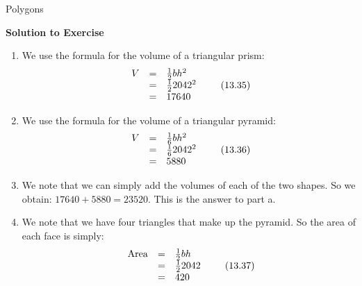 \begin{exercises}{Polygons}
{\begin{mdframed}[linewidth=4, leftmargin=40, rightmargin=40]
\begin{exercise}
\begin{figure}[H]
\begin{center}
    \end{center}

 \end{figure}   

    \addtocounter{footnote}{-0}
    \par 
\vspace{5pt}
\label{m39357*solid7634}\noindent\textbf{Solution to Exercise }
\label{m39357*id6375}\begin{enumerate}[noitemsep, label=\textbf{Step} \textbf{\arabic*}. ] 
            \leftskip=20pt\rightskip=\leftskip\item We use the formula for the volume of a triangular prism:
\label{m39357*id6923}\nopagebreak\noindent{}
    \begin{equation}
    \begin{array}{ccc}V& =& \frac{1}{2}b{h}^{2}\hfill \\ & =& \frac{1}{2}20{42}^{2}\hfill \\ & =& 17640\hfill \end{array}\tag{13.35}
      \end{equation}
    
\item We use the formula for the volume of a triangular pyramid:
\label{m39357*id67423}\nopagebreak\noindent{}
    \begin{equation}
    \begin{array}{ccc}V& =& \frac{1}{6}b{h}^{2}\hfill \\ & =& \frac{1}{6}20{42}^{2}\hfill \\ & =& 5880\hfill \end{array}\tag{13.36}
      \end{equation}
    
\item We note that we can simply add the volumes of each of the two shapes. So we obtain: $17640+5880=23520$. This is the answer to part a.\item We note that we have four triangles that make up the pyramid. So the area of each face is simply:
\label{m39357*id6783}\nopagebreak\noindent{}
    \begin{equation}
    \begin{array}{ccc}\mathrm{Area}& =& \frac{1}{2}bh\hfill \\ & =& \frac{1}{2}2042\hfill \\ & =& 420\hfill \end{array}\tag{13.37}
      \end{equation}
    


\end{enumerate}
\end{exercise}
\end{mdframed}}
\end{exercises}
